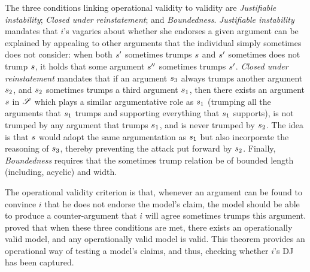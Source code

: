 \documentclass[version=3.21, pagesize, twoside=off, bibliography=totoc, DIV=calc, fontsize=12pt, a4paper, french, english]{scrartcl}
\begin{document}
The three conditions linking operational validity to validity are \emph{Justifiable instability}; \emph{Closed under reinstatement}; and \emph{Boundedness}. \emph{Justifiable instability} mandates that $i$’s vagaries about whether she endorses a given argument can be explained by appealing to other arguments that the individual simply sometimes does not consider: when both $s'$ sometimes trumps $s$ and $s'$ sometimes does not trump $s$, it holds that some argument $s''$ sometimes trumps $s'$. 
\emph{Closed under reinstatement} mandates that if an argument $s_3$ always trumps another argument $s_2$, and $s_2$ sometimes trumps a third argument $s_1$, then there exists an argument $s$ in $\mathscr{S}$ which plays a similar argumentative role as $s_1$ (trumping all the arguments that $s_1$ trumps and supporting everything that $s_1$ supports), is not trumped by any argument that trumps $s_1$, and is never trumped by $s_2$. The idea is that $s$ would adopt the same argumentation as $s_1$ but also incorporate the reasoning of $s_3$, thereby preventing the attack put forward by $s_2$. 
Finally, \emph{Boundedness} requires that the sometimes trump relation be of bounded length (including, acyclic) and width.

The operational validity criterion is that, whenever an argument can be found to convince $i$ that he does not endorse the model’s claim, the model should be able to produce a counter-argument that $i$ will agree sometimes trumps this argument.  proved that when these three conditions are met, there exists an operationally valid model, and any operationally valid model is valid. 
This theorem provides an operational way of testing a model’s claims, and thus, checking whether $i$’s \ac{DJ} has been captured.
\end{document}
